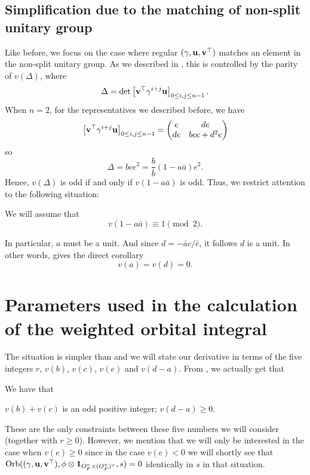 \subsection{Simplification due to the matching of non-split unitary group}
Like before, we focus on the case where regular $(\gamma, \mathbf u, \mathbf v^\top)$
matches an element in the non-split unitary group.
As we described in ,
this is controlled by the parity of $v(\Delta)$, where
\[ \Delta = \det \left[ \mathbf v^\top \gamma^{i+j} \mathbf u \right]_{0 \le i,j \le n-1}. \]
When $n=2$, for the representatives we described before,
we have
\[ \left[ \mathbf v^\top \gamma^{i+j} \mathbf u \right]_{0 \le i,j \le n-1}
  = \begin{pmatrix} e & de \\ de & bce + d^2e \end{pmatrix} \]
so
\[ \Delta = bce^2 = \frac{b}{\bar b}(1-a \bar a) e^2 . \]
Hence, $v(\Delta)$ is odd if and only if $v(1-a \bar a)$ is odd.
Thus, we restrict attention to the following situation:
\begin{assume}
  \label{assume:a_odd}
  We will assume that
  \[ v(1-a \bar a) \equiv 1 \pmod 2. \]
\end{assume}
In particular, $a$ must be a unit.
And since $d = -\bar a c / \bar c$, it follows $d$ is a unit.
In other words,  gives the direct corollary
\[ v(a) = v(d) = 0. \]

\section{Parameters used in the calculation of the weighted orbital integral}
The situation is simpler than 
and we will state our derivative in terms of the five integers
$r$, $v(b)$, $v(c)$, $v(e)$ and $v(d-a)$.
From , we actually get that
\begin{assume}
  \label{assume:FJ}
  We have that
  \begin{itemize}
    \ii $v(b) + v(c)$ is an odd positive integer;
    \ii $v(d-a) \ge 0$.
  \end{itemize}
\end{assume}
These are the only constraints between these five numbers we will consider
(together with $r \ge 0$).
However, we mention that we will only be interested in the case when $v(e) \ge 0$
since in the case $v(e) < 0$ we will shortly see that
$\operatorname{Orb}({(\gamma, \mathbf u, \mathbf v^\top)}, \phi \otimes \mathbf{1}_{O_F^n \times (O_F^n)^\vee}, s) = 0$ identically in $s$ in that situation.

